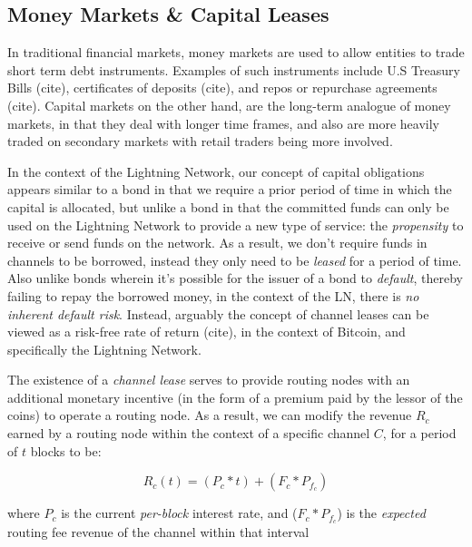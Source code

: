 \documentclass[12pt,a4paper]{article}
\theoremstyle{definition}
\begin{document}

\subsection{Money Markets \& Capital Leases} %

In traditional financial markets, money markets are used to allow entities to
trade short term debt instruments. Examples of such instruments include U.S
Treasury Bills (cite), certificates of deposits (cite), and repos or repurchase
agreements (cite). Capital markets on the other hand, are the long-term
analogue of money markets, in that they deal with longer time frames, and also
are more heavily traded on secondary markets with retail traders being more
involved.

In the context of the Lightning Network, our concept of capital obligations
appears similar to a bond in that we require a prior period of time in
which the capital is allocated, but unlike a bond in that the committed funds
can only be used on the Lightning Network to provide a new type of service: the
\emph{propensity} to receive or send funds on the network. As a result, we
don't require funds in channels to be borrowed, instead they only need to be
\emph{leased} for a period of time. Also unlike bonds wherein it's possible for
the issuer of a bond to \emph{default}, thereby failing to repay the borrowed
money, in the context of the LN, there is \emph{no inherent default risk}.
Instead, arguably the concept of channel leases can be viewed as a risk-free
rate of return (cite), in the context of Bitcoin, and specifically the
Lightning Network.

The existence of a \emph{channel lease} serves to provide routing nodes with an
additional monetary incentive (in the form of a premium paid by the lessor of
the coins) to operate a routing node. As a result, we can modify the revenue
$R_c$ earned by a routing node within the context of a specific channel $C$,
for a period of $t$ blocks to be:

\begin{equation}
R_c(t) = (P_c * t) + (F_c* P_{f_c}) %
\end{equation}

where $P_c$ is the current \emph{per-block} interest rate, and ($F_c *
P_{f_c}$) is the \emph{expected} routing fee revenue of the channel within that
interval \\
\end{document}
